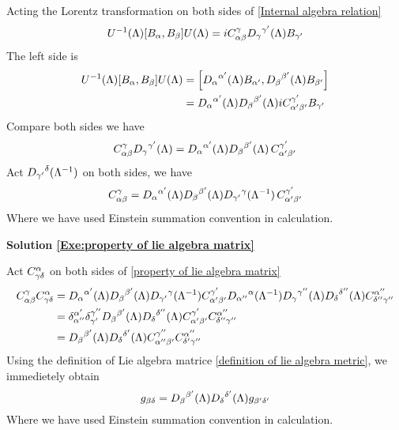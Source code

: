 Acting the Lorentz transformation on both sides of  \eqref{Internal algebra relation}
\begin{equation}
U^{-1}(\Lambda)\comm{B_\a}{B_\be}U(\Lambda)
= i C^{\g}_{\a\be}{D_{\g}}^{\g'}(\Lambda)B_{\g'}
\end{equation}
The left side is
\begin{align}
U^{-1}(\Lambda)\comm{B_\a}{B_\be}U(\Lambda)
&=\comm{{D_\a}^{\a'}(\Lambda)B_{\a'}}
{{D_\be}^{\be'}(\Lambda)B_{\be'}}\notag\\
&={D_\a}^{\a'}(\Lambda){D_\be}^{\be'}(\Lambda)
iC^{\g'}_{\a'\be'}B_{\g'}
\end{align}
Compare both sides we have
\begin{equation}
C^{\gamma}_{\alpha\beta}{D_{\gamma}}^{\gamma'}(\Lambda)={D_\alpha}^{\alpha'}(\Lambda){D_\beta}^{\beta'}(\Lambda)
\,C^{\gamma'}_{\alpha'\beta'}
\end{equation}
Act ${D_{\gamma'}}^{\delta}(\Lambda^{-1})$ on both sides, we have
\begin{equation}
C^{\gamma}_{\alpha\beta}={D_\alpha}^{\alpha'}(\Lambda){D_\beta}^{\beta'}(\Lambda)
{D_{\gamma'}}^{\gamma}(\Lambda^{-1})\,C^{\gamma'}_{\alpha'\beta'}
\end{equation}
Where we have used Einstein summation convention in calculation.

\qquad

\noindent\textbf{Solution \ref{Exe:property of lie algebra matrix}}

Act $C^{\alpha}_{\gamma\delta}$ on both sides of \eqref{property of lie algebra matrix}
\begin{align}
  C^{\gamma}_{\alpha\beta}C^{\alpha}_{\gamma\delta}&=
  {D_{\alpha}}^{\alpha'}(\Lambda)
  {D_{\beta}}^{\beta'}(\Lambda)
  {D_{\gamma'}}^{\gamma}(\Lambda^{-1})
  C^{\gamma'}_{\alpha'\beta'}
  {D_{\alpha''}}^{\alpha}(\Lambda^{-1})
  {D_{\gamma}}^{\gamma''}(\Lambda)
  {D_{\delta}}^{\delta''}(\Lambda)C^{\alpha''}_{\delta''\gamma''}\notag\\
  &=
  \delta_{\alpha''}^{\alpha'}
  \delta_{\gamma'}^{\gamma''}
  {D_{\beta}}^{\beta'}(\Lambda)
  {D_{\delta}}^{\delta''}(\Lambda)
  C^{\gamma'}_{\alpha'\beta'}
  C^{\alpha''}_{\delta''\gamma''}\notag\\
  &=
  {D_{\beta}}^{\beta'}(\Lambda)
  {D_{\delta}}^{\delta'}(\Lambda)
  C^{\gamma''}_{\alpha''\beta'}
  C^{\alpha''}_{\delta'\gamma''}
\end{align}
Using the definition of Lie algebra matrice \eqref{definition of lie algebra metric}, we immedietely obtain 
\begin{equation}
  g_{\beta\delta} = 
  {D_{\beta}}^{\beta'}(\Lambda)
  {D_{\delta}}^{\delta'}(\Lambda)
  g_{\beta'\delta'}
\end{equation}
Where we have used Einstein summation convention in calculation.